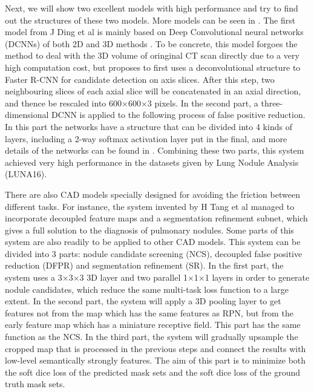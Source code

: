 \documentclass[conference]{IEEEtran}
\begin{document}
Next, we will show two excellent models with high performance and try to find out the structures of these two models. More models can be seen in \cite{SETIO20171}. The first model from J Ding et al is mainly based on Deep Convolutional neural networks (DCNNs) of both 2D and 3D methods \cite{10.1007/978-3-319-66179-7_64}. To be concrete, this model forgoes the method to deal with the 3D volume of oringinal CT scan directly due to a very high computation cost, but proposes to first uses a deconvolutional structure to Faster R-CNN for candidate detection on axis slices. After this step, two neighbouring slices of each axial slice will be concatenated in an axial direction, and thence be rescaled into 600$\times$600$\times$3 pixels. In the second part, a three-dimensional DCNN is applied to the following process of false positive reduction. In this part the networks have a structure that can be divided into 4 kinds of layers, including a 2-way softmax activation layer put in the final, and more details of the networks can be found in \cite{10.1007/978-3-319-66179-7_64}. Combining these two parts, this system achieved very high performance in the datasets given by Lung Nodule Analysis (LUNA16).


There are also CAD models specially designed for avoiding the friction between different tasks. For instance, the system invented by H Tang et al \cite{10.1007/978-3-030-32226-7_30} managed to incorporate decoupled feature maps and a segmentation refinement subnet, which gives a full solution to the diagnosis of pulmonary nodules. Some parts of this system are also readily to be applied to other CAD models. This system can be divided into 3 parts: nodule candidate screening (NCS), decoupled false positive reduction (DFPR) and segmentation refinement (SR). In the first part, the system uses a 3$\times$3$\times$3 3D layer and two parallel 1$\times$1$\times$1 layers in order to generate nodule candidates, which reduce the same multi-task loss function to a large extent. In the second part, the system will apply a 3D pooling layer to get features not from the map which has the same features as RPN, but from the early feature map which has a miniature receptive field. This part has the same function as the NCS. In the third part, the system will gradually upsample the cropped map that is processed in the previous steps and connect the results with low-level semantically strongly features. The aim of this part is to minimize both the soft dice loss of the predicted mask sets and the soft dice loss of the ground truth mask sets.
\end{document}
